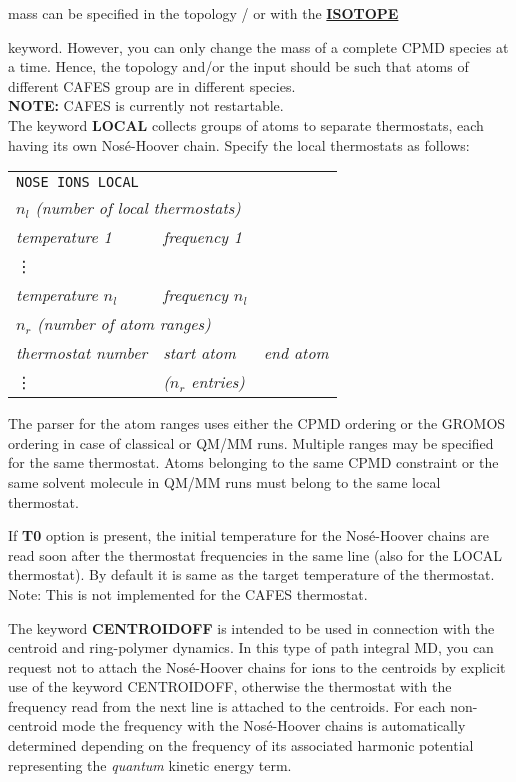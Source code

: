 \documentclass[twoside,10pt,titlepage,a4paper]{article}
\newcommand{\referto}[2]{\hyperlink{#1}{#2}}
\newcommand{\referto}[2]{\htmlref{#2}{#1}}
\newcommand{\refkeyword}[1]{%
\referto{#1}{\textbf{#1}}%
\index{#1}%
}%
\begin{document}
{      mass can be specified in the topology / or with the \refkeyword{ISOTOPE}
      keyword. However, you can only change the mass of a complete CPMD
      species at a time. Hence, the topology and/or the input should be
      such that atoms of different CAFES group are in different species.\\
      {\bf NOTE:} CAFES is currently not restartable.\\[2ex]
      The keyword {\bf LOCAL} collects groups of atoms to separate
      thermostats, each having its own Nos\'e-Hoover chain. Specify
      the local thermostats as follows:\\[1ex]
      \begin{tabular}{lll}
        \multicolumn{3}{l}{\tt NOSE IONS LOCAL}\\
        \multicolumn{3}{l}{$n_l$ \em (number of local thermostats)}\\
        \em temperature 1 & \em frequency 1&\\
        \vdots\\
        \em temperature $n_l$ & \em frequency $n_l$ &\\[1ex]
       \multicolumn{3}{l}{$n_r$ \em (number of atom ranges)}\\ 
        \em thermostat number & \em start atom & \em end atom\\
        \vdots &\em ($n_r$ entries)&\\
      \end{tabular}

      The parser for the atom ranges uses either the CPMD ordering or
      the GROMOS ordering in case of classical or QM/MM runs. Multiple
      ranges may be specified for the same thermostat. Atoms belonging
      to the same CPMD constraint or the same solvent molecule in
      QM/MM runs must belong to the same local thermostat.
      
      If {\bf T0} option is present, the initial temperature for the
      Nos{\'e}-Hoover chains are read soon after the thermostat frequencies in the same line (also for the
      LOCAL thermostat). By default it is same as the target temperature of the thermostat. 
      Note: This is not implemented for the CAFES thermostat.}

      The keyword {\bf CENTROIDOFF} is intended to be used in connection with 
      the centroid and ring-polymer dynamics. In this type of path integral MD,
      you can request not to attach the Nos{\' e}-Hoover chains for ions to the centroids 
      by explicit use of the keyword CENTROIDOFF, otherwise the thermostat with the 
      frequency read from the next line is attached to the centroids.
      For each non-centroid mode the frequency with the Nos{\' e}-Hoover chains is 
      automatically determined depending on the frequency of its associated harmonic potential 
      representing the {\it quantum} kinetic energy term.  
\end{document}
